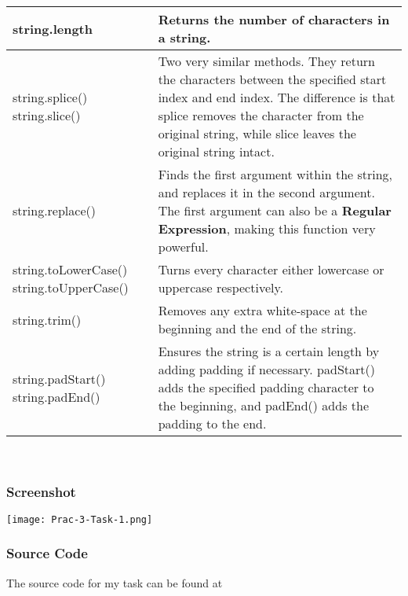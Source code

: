 \documentclass[portfolio.tex]{subfiles}
\begin{document}
				 \begin{tabular}{|P{4cm}|p{10cm}|}
				 	\hline
				 	string.length & Returns the number of characters in a string. \\
				 	\hline
				 	\hspace{0.3cm}string.splice() \newline string.slice() & Two very similar methods. They return the characters between the specified start index and end index. The difference is that splice removes the character from the original string, while slice leaves the original string intact. \\
				 	\hline
				 	string.replace()& Finds the first argument within the string, and replaces it in the second argument. The first argument can also be a \textbf{Regular Expression}, making this function very powerful. \\
				 	\hline
				 	string.toLowerCase() \newline string.toUpperCase() & Turns every character either lowercase or uppercase respectively. \\
				 	\hline
				 	string.trim() & Removes any extra white-space at the beginning and the end of the string.  \\
				 	\hline
				 	\hspace{0.3cm}string.padStart() \newline string.padEnd() & Ensures the string is a certain length by adding padding if necessary. padStart() adds the specified padding character to the beginning, and padEnd() adds the padding to the end. \\
				 	\hline
				 \end{tabular}

			 	\autocite{string-methods}\\

			 	\subsubsection{Screenshot}
			 	\begin{center}
				 	\texttt{[image: Prac-3-Task-1.png]}
			 	\end{center}


			 	\subsubsection{Source Code}
				The source code for my task can be found at 
\end{document}
